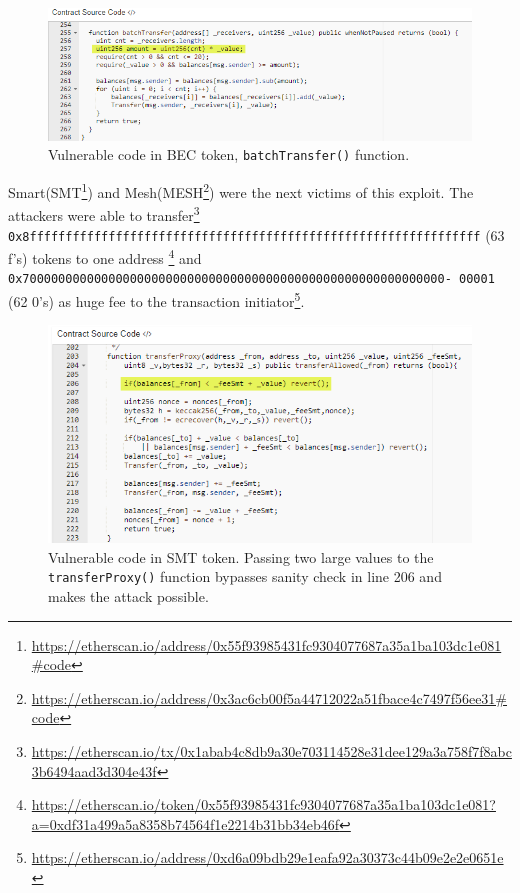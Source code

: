 \begin{figure}[t]
	\centering
	\includegraphics[width=0.9\linewidth]{figures/img03.png}
	\caption{Vulnerable code in BEC token, \texttt{batchTransfer()} function.}
	\label{fig:bec}
\end{figure}

Smart(SMT\footnote{\url{https://etherscan.io/address/0x55f93985431fc9304077687a35a1ba103dc1e081\#code}}) and Mesh(MESH\footnote{\url{https://etherscan.io/address/0x3ac6cb00f5a44712022a51fbace4c7497f56ee31\#code}}) were the next victims of this exploit. The attackers were able to transfer\footnote{\url{https://etherscan.io/tx/0x1abab4c8db9a30e703114528e31dee129a3a758f7f8abc3b6494aad3d304e43f}} \texttt{0x8fffffffffffffffffffffffffffffffffffffffffffffffffffffffffffffff} (63 f’s) tokens to one address \footnote{\url{https://etherscan.io/token/0x55f93985431fc9304077687a35a1ba103dc1e081?a=0xdf31a499a5a8358b74564f1e2214b31bb34eb46f}} and \texttt{0x70000000000000000000000000000000000000000000000000000000000-
00001} (62 0's) as huge fee to the transaction initiator\footnote{\url{https://etherscan.io/address/0xd6a09bdb29e1eafa92a30373c44b09e2e2e0651e}}.

\begin{figure}[t]
	\centering
	\includegraphics[width=1.0\linewidth]{figures/img04.png}
	\caption{Vulnerable code in SMT token. Passing two large values to the \texttt{transferProxy()} function bypasses sanity check in line 206 and makes the attack possible.}
	\label{fig:smt}	
\end{figure}

